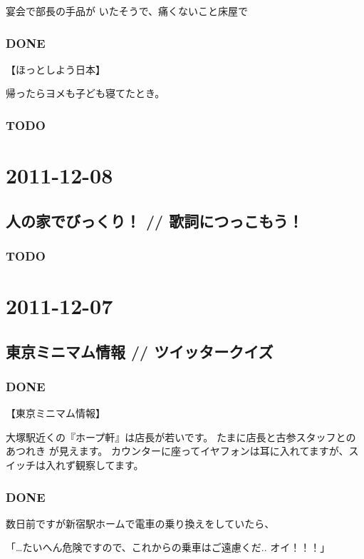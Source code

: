 \documentclass[11pt]{article}
\begin{document}
宴会で部長の手品が
いたそうで、痛くないこと床屋で
\subsubsection{\textbf{DONE}}
\label{sec-23_1_2}

【ほっとしよう日本】

帰ったらヨメも子ども寝てたとき。
\subsubsection{\textbf{TODO}}
\label{sec-23_1_3}
\section{2011-12-08}
\label{sec-24}
\subsection{人の家でびっくり！ // 歌詞につっこもう！}
\label{sec-24_1}
\subsubsection{\textbf{TODO}}
\label{sec-24_1_1}
\section{2011-12-07}
\label{sec-25}
\subsection{東京ミニマム情報 // ツイッタークイズ}
\label{sec-25_1}
\subsubsection{\textbf{DONE}}
\label{sec-25_1_1}

【東京ミニマム情報】

大塚駅近くの『ホープ軒』は店長が若いです。
たまに店長と古参スタッフとの あつれき が見えます。
カウンターに座ってイヤフォンは耳に入れてますが、スイッチは入れず観察してます。
\subsubsection{\textbf{DONE}}
\label{sec-25_1_2}

数日前ですが新宿駅ホームで電車の乗り換えをしていたら、

「\ldots{}たいへん危険ですので、これからの乗車はご遠慮くだ..  オイ！！！」
\end{document}
